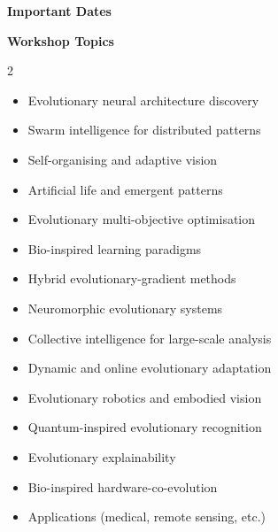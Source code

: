 \documentclass[a4paper,11pt]{article}
\begin{document}

\begin{center}
{\Large \textbf{\color{sage!60!black}Important Dates}}
\end{center}
\vspace{0.2cm}

\vspace{0.2cm}

\begin{center}
{\Large \textbf{\color{sage!60!black}Workshop Topics}}
\end{center}
\vspace{0.2cm}
\begin{multicols}{2}
\begin{itemize}[label={\color{coral}\textbullet}, itemsep=0.0em, leftmargin=*]
\small
\item Evolutionary neural architecture discovery
\item Swarm intelligence for distributed patterns
\item Self-organising and adaptive vision
\item Artificial life and emergent patterns
\item Evolutionary multi-objective optimisation
\item Bio-inspired learning paradigms
\item Hybrid evolutionary-gradient methods
\item Neuromorphic evolutionary systems
\item Collective intelligence for large-scale analysis
\item Dynamic and online evolutionary adaptation
\item Evolutionary robotics and embodied vision
\item Quantum-inspired evolutionary recognition
\item Evolutionary explainability
\item Bio-inspired hardware-co-evolution
\item Applications (medical, remote sensing, etc.)
\end{itemize}
\end{multicols}
\end{document}

